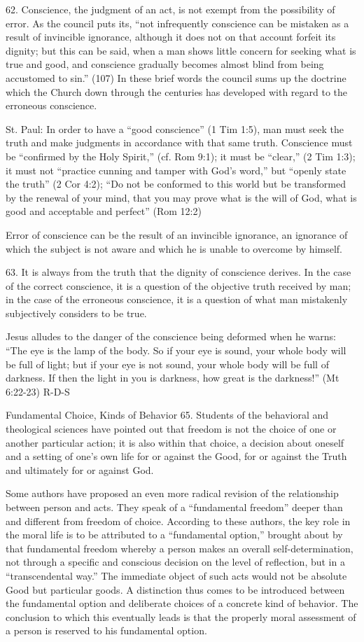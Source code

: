 \documentclass[oneside]{book}
\begin{document}
62. Conscience, the judgment of an act, is not exempt from the possibility of
error. As the council puts its, ``not infrequently conscience can be mistaken as
a result of invincible ignorance, although it does not on that account forfeit
its dignity; but this can be said, when a man shows little concern for seeking
what is true and good, and conscience gradually becomes almost blind from being
accustomed to sin.'' (107) In these brief words the council sums up the doctrine
which the Church down through the centuries has developed with regard to the
erroneous conscience.

St. Paul: In order to have a ``good conscience'' (1 Tim 1:5), man must seek the
truth and make judgments in accordance with that same truth. Conscience must be
``confirmed by the Holy Spirit,'' (cf. Rom 9:1); it must be ``clear,'' (2 Tim
1:3); it must not ``practice cunning and tamper with God's word,'' but ``openly
state the truth'' (2 Cor 4:2); ``Do not be conformed to this world but be
transformed by the renewal of your mind, that you may prove what is the will of
God, what is good and acceptable and perfect'' (Rom 12:2)

Error of conscience can be the result of an invincible ignorance, an ignorance
of which the subject is not aware and which he is unable to overcome by himself.

63. It is always from the truth that the dignity of conscience derives. In the
case of the correct conscience, it is a question of the objective truth received
by man; in the case of the erroneous conscience, it is a question of what man
mistakenly subjectively considers to be true.

Jesus alludes to the danger of the conscience being deformed when he warns:
``The eye is the lamp of the body. So if your eye is sound, your whole body will
be full of light; but if your eye is not sound, your whole body will be full of
darkness. If then the light in you is darkness, how great is the darkness!'' (Mt
6:22-23)
R-D-S

Fundamental Choice, Kinds of Behavior
65. Students of the behavioral and theological sciences have pointed out that
freedom is not the choice of one or another particular action; it is also within
that choice, a decision about oneself and a setting of one's own life for or
against the Good, for or against the Truth and ultimately for or against God.

Some authors have proposed an even more radical revision of the relationship
between person and acts. They speak of a ``fundamental freedom'' deeper than and
different from freedom of choice. According to these authors, the key role in
the moral life is to be attributed to a ``fundamental option,'' brought about by
that fundamental freedom whereby a person makes an overall self-determination,
not through a specific and conscious decision on the level of reflection, but in
a ``transcendental way.'' The immediate object of such acts would not be
absolute Good but particular goods. A distinction thus comes to be introduced
between the fundamental option and deliberate choices of a concrete kind of
behavior. The conclusion to which this eventually leads is that the properly
moral assessment of a person is reserved to his fundamental option.
\end{document}
